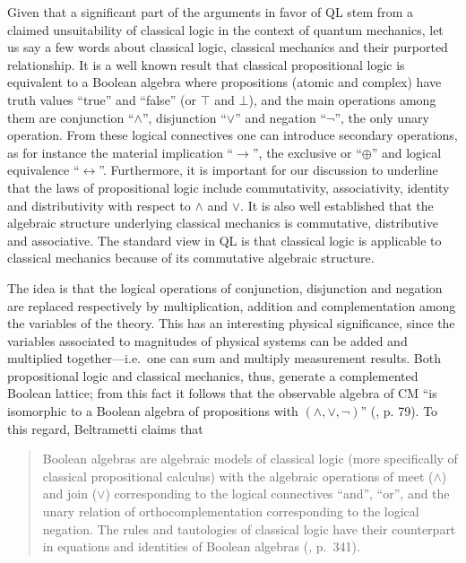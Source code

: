 \documentclass[11pt, executivepaper]{article}
\begin{document}
Given that a significant part of the arguments in favor of QL stem from a claimed unsuitability of classical logic in the context of quantum mechanics, let us say a few words about classical logic, classical mechanics and their purported relationship.  It is a well known result that classical propositional logic is equivalent to a Boolean algebra where propositions (atomic and complex) have truth values ``true'' and ``false'' (or $\top$ and $\bot$), and the main operations among them are conjunction ``$\wedge$'', disjunction ``$\vee$'' and negation ``$\neg$'', the only unary operation. From these logical connectives one can introduce secondary operations, as for instance the material implication ``$\longrightarrow$'', the exclusive or ``$\oplus$'' and logical equivalence ``$\longleftrightarrow$''. Furthermore, it is important for our discussion to underline that the laws of propositional logic include commutativity, associativity, identity and distributivity with respect to $\wedge$ and $\vee$. It is also well established that the algebraic structure underlying classical mechanics is commutative, distributive and associative. The standard view in QL is that classical logic is applicable to classical mechanics because of its commutative algebraic structure.

The idea is that the logical operations of conjunction, disjunction and negation are replaced respectively by multiplication, addition and complementation among the variables of the theory. This has an interesting physical significance, since the variables associated to magnitudes of physical systems can be added and multiplied together---i.e.\ one can sum and multiply measurement results. Both propositional logic and classical mechanics, thus, generate a complemented Boolean lattice; from this fact it follows that the observable algebra of CM ``is isomorphic to a Boolean algebra of propositions with $(\wedge, \vee, \neg)$'' (\cite{David:2015}, p. 79).
To this regard, Beltrametti claims that 
\begin{quote}
Boolean algebras are algebraic models of classical logic (more specifically of classical propositional calculus) with the algebraic operations of meet ($\wedge$) and join ($\vee$) corresponding to the logical connectives ``and'', ``or'', and the unary relation of orthocomplementation corresponding to the logical negation. The rules and tautologies of classical logic have their counterpart in equations and identities of Boolean algebras (\cite{Beltrametti:2004}, p.\ 341). 
\end{quote}
\end{document}
